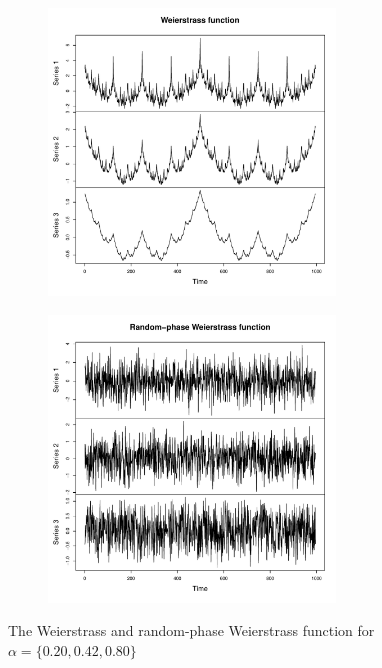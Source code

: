 \begin{figure}[h]
  \begin{subfigure}[b]{0.49\textwidth}
\includegraphics[width = 0.9\linewidth, height = 3in]{./figs/holder_notrandom-weier-notrandom.pdf}
    \label{fig:weierstrass}
  \end{subfigure}
  \hfill
  \begin{subfigure}[b]{0.49\textwidth}
  \includegraphics[width = 0.9\linewidth, height = 3in]{./figs/holder_coeffs-weier-random.pdf}
  \end{subfigure}
  \caption{The Weierstrass and random-phase Weierstrass function
  for $\alpha = \{ 0.20, 0.42, 0.80 \}$}
    \label{fig:weierstrass}
\end{figure}

